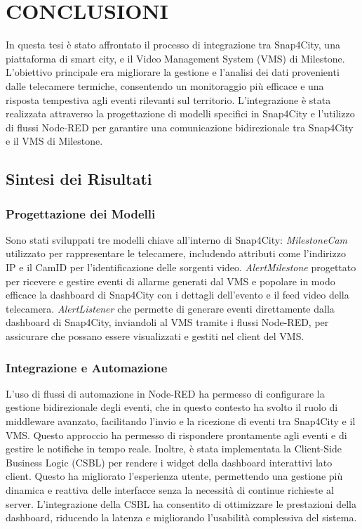 \documentclass[a4paper, openright, thesis]{report}
\begin{document}
\chapter{CONCLUSIONI}

In questa tesi è stato affrontato il processo di integrazione tra Snap4City, una piattaforma di smart city, e il Video Management System (VMS) di Milestone. L'obiettivo principale era migliorare la gestione e l'analisi dei dati provenienti dalle telecamere termiche, consentendo un monitoraggio più efficace e una risposta tempestiva agli eventi rilevanti sul territorio. L'integrazione è stata realizzata attraverso la progettazione di modelli specifici in Snap4City e l'utilizzo di flussi Node-RED per garantire una comunicazione bidirezionale tra Snap4City e il VMS di Milestone.

\section{Sintesi dei Risultati}

\subsection{Progettazione dei Modelli}
Sono stati sviluppati tre modelli chiave all'interno di Snap4City:
\textit{MilestoneCam} utilizzato per rappresentare le telecamere, includendo attributi come l'indirizzo IP e il CamID per l'identificazione delle sorgenti video.
\textit{AlertMilestone} progettato per ricevere e gestire eventi di allarme generati dal VMS e popolare in modo efficace la dashboard di Snap4City con i dettagli dell’evento e il feed video della telecamera.
\textit{AlertListener} che permette di generare eventi direttamente dalla dashboard di Snap4City, inviandoli al VMS tramite i flussi Node-RED, per assicurare che possano essere visualizzati e gestiti nel client del VMS.

\subsection{Integrazione e Automazione}
L'uso di flussi di automazione in Node-RED ha permesso di configurare la gestione bidirezionale degli eventi, che in questo contesto ha svolto il ruolo di middleware avanzato, facilitando l’invio e la ricezione di eventi tra Snap4City e il VMS. Questo approccio ha permesso di rispondere prontamente agli eventi e di gestire le notifiche in tempo reale.
Inoltre, è stata implementata la Client-Side Business Logic (CSBL) per rendere i widget della dashboard interattivi lato client. Questo ha migliorato l’esperienza utente, permettendo una gestione più dinamica e reattiva delle interfacce senza la necessità di continue richieste al server. L’integrazione della CSBL ha consentito di ottimizzare le prestazioni della dashboard, riducendo la latenza e migliorando l’usabilità complessiva del sistema.
\end{document}
